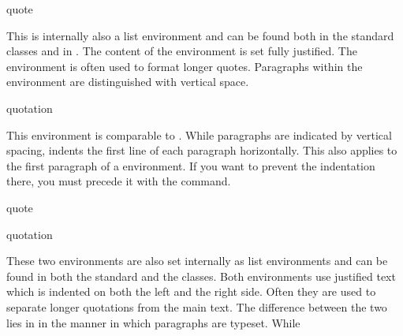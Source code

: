   \fi
  \EndIndexGroup

  \iffalse%
    \begin{Declaration}
  	  \begin{Environment}{quote}\end{Environment}
  	\end{Declaration}%
  	This is
  	internally also a list environment and can be found both in the standard classes and in
  	{\KOMAScript}. The content of the environment is set fully justified.
    The environment is often used to format longer quotes.
    Paragraphs within the environment are distinguished with vertical space.%
    \EndIndexGroup

    \begin{Declaration}
      \begin{Environment}{quotation}\end{Environment}
    \end{Declaration}%
    This
    environment is comparable to
    . While
     paragraphs are indicated by
    vertical spacing,  indents the first line of each
    paragraph horizontally. This also applies to the first paragraph of a
     environment. If you want to prevent the
    indentation there, you must precede it with the
     command.%
  \else
    \begin{Declaration}
      \begin{Environment}{quote}\end{Environment}
      \begin{Environment}{quotation}\end{Environment}
    \end{Declaration}%
     These two
    environments are also set internally as list
    environments and can be found in both the standard and the {\KOMAScript}
    classes. Both environments use justified text which is indented on both
    the left and the right side. Often they are used to separate longer
    quotations from the main text. The difference between
    the two lies in in the manner in which paragraphs are typeset. While
